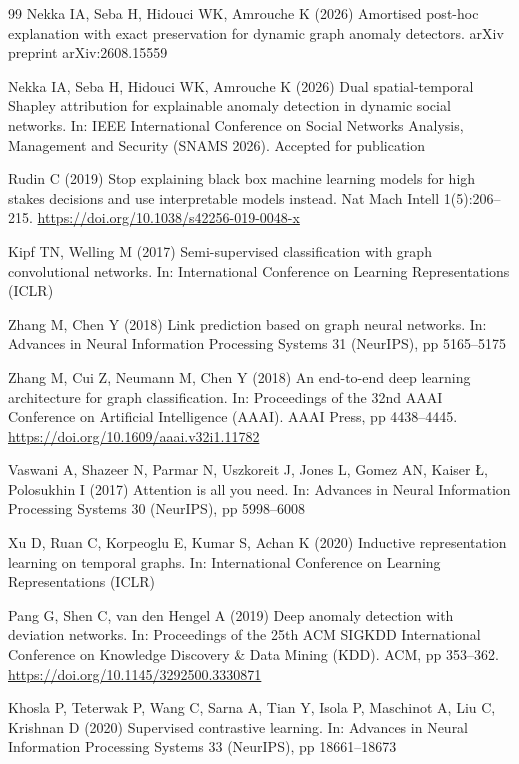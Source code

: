 \documentclass[pdflatex,sn-basic]{sn-jnl}
\theoremstyle{definition}
\theoremstyle{plain}
\begin{document}
\begin{thebibliography}{99}
Nekka IA, Seba H, Hidouci WK, Amrouche K (2026) Amortised post-hoc explanation with exact preservation for dynamic graph anomaly detectors. arXiv preprint arXiv:2608.15559

Nekka IA, Seba H, Hidouci WK, Amrouche K (2026) Dual spatial-temporal Shapley attribution for explainable anomaly detection in dynamic social networks. In: IEEE International Conference on Social Networks Analysis, Management and Security (SNAMS 2026). Accepted for publication

Rudin C (2019) Stop explaining black box machine learning models for high stakes decisions and use interpretable models instead. Nat Mach Intell 1(5):206--215. \url{https://doi.org/10.1038/s42256-019-0048-x}

Kipf TN, Welling M (2017) Semi-supervised classification with graph convolutional networks. In: International Conference on Learning Representations (ICLR)

Zhang M, Chen Y (2018) Link prediction based on graph neural networks. In: Advances in Neural Information Processing Systems 31 (NeurIPS), pp 5165--5175

Zhang M, Cui Z, Neumann M, Chen Y (2018) An end-to-end deep learning architecture for graph classification. In: Proceedings of the 32nd AAAI Conference on Artificial Intelligence (AAAI). AAAI Press, pp 4438--4445. \url{https://doi.org/10.1609/aaai.v32i1.11782}

Vaswani A, Shazeer N, Parmar N, Uszkoreit J, Jones L, Gomez AN, Kaiser {\L}, Polosukhin I (2017) Attention is all you need. In: Advances in Neural Information Processing Systems 30 (NeurIPS), pp 5998--6008

Xu D, Ruan C, Korpeoglu E, Kumar S, Achan K (2020) Inductive representation learning on temporal graphs. In: International Conference on Learning Representations (ICLR)

Pang G, Shen C, van den Hengel A (2019) Deep anomaly detection with deviation networks. In: Proceedings of the 25th ACM SIGKDD International Conference on Knowledge Discovery \& Data Mining (KDD). ACM, pp 353--362. \url{https://doi.org/10.1145/3292500.3330871}

Khosla P, Teterwak P, Wang C, Sarna A, Tian Y, Isola P, Maschinot A, Liu C, Krishnan D (2020) Supervised contrastive learning. In: Advances in Neural Information Processing Systems 33 (NeurIPS), pp 18661--18673


\end{thebibliography}
\end{document}
